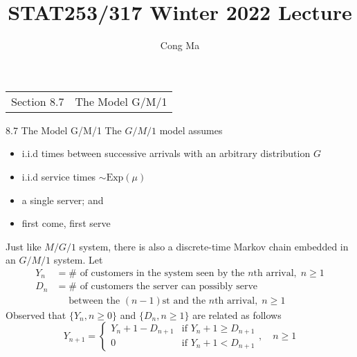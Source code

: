 \documentclass[letterpaper,handout]{beamer}
\title{STAT253/317 Winter 2022 Lecture \chapnum} \date{} \author{Cong Ma}
\begin{document}
\begin{frame}\maketitle
\bigskip

\begin{center}\large
\begin{tabular}{ll}
Section 8.7 & The Model G/M/1\\
\end{tabular}
\end{center}
\end{frame}
\begin{frame}{8.7 The Model G/M/1}
The $G/M/1$ model assumes
\begin{itemize}
\item i.i.d times between successive arrivals with an arbitrary distribution $G$
\item i.i.d service times $\sim \mbox{Exp}(\mu)$
\item a single server; and
\item first come, first serve
\end{itemize}
Just like $M/G/1$ system, there is also a discrete-time Markov chain embedded in an $G/M/1$ system. Let
\begin{align*}
Y_n &=\#\mbox{ of customers in the system seen by the $n$th arrival},\; n\ge 1\\
D_n &=\#\mbox{ of customers the server can possibly serve}\\
&\quad\mbox{  between the $(n-1)$st and the $n$th arrival},\; n\ge 1
\end{align*}
Observed that $\{Y_n, n\ge 0\}$ and $\{D_n,n\ge 1\}$ are related as follows
$$
Y_{n+1} = %
\begin{cases}
Y_n+1-D_{n+1} & \mbox{if } Y_n+1\ge D_{n+1}\\
0 & \mbox{if } Y_n+1 < D_{n+1}
\end{cases},\quad n\ge 1
$$
\end{frame}
\end{document}
